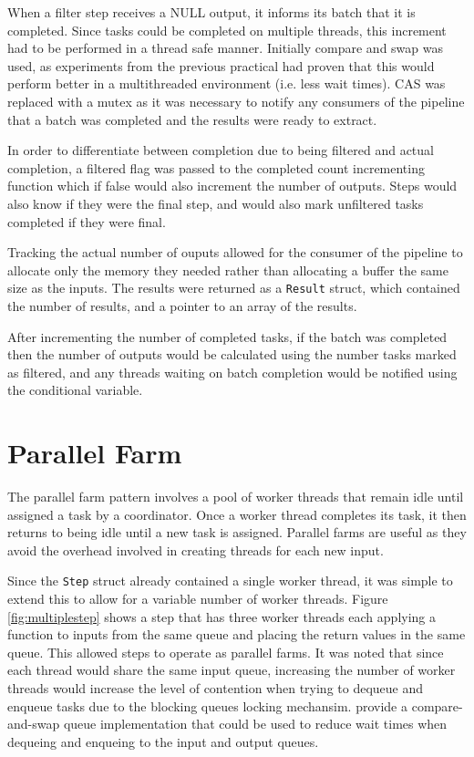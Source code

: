 \documentclass[12pt]{article}
\def\code#1{\texttt{#1}}
\begin{document}
When a filter step receives a NULL output, it informs its batch that it is completed. Since tasks could be completed on multiple threads, this increment had to be performed in a thread safe manner. Initially compare and swap was used, as experiments from the previous practical had proven that this would perform better in a multithreaded environment (i.e. less wait times). CAS was replaced with a mutex as it was necessary to notify any consumers of the pipeline that a batch was completed and the results were ready to extract. 

In order to differentiate between completion due to being filtered and actual completion, a filtered flag was passed to the completed count incrementing function which if false would also increment the number of outputs. Steps would also know if they were the final step, and would also mark unfiltered tasks completed if they were final. 

Tracking the actual number of ouputs allowed for the consumer of the pipeline to allocate only the memory they needed rather than allocating a buffer the same size as the inputs. The results were returned as a \code{Result} struct, which contained the number of results, and a pointer to an array of the results.

After incrementing the number of completed tasks, if the batch was completed then the number of outputs would be calculated using the number tasks marked as filtered, and any threads waiting on batch completion would be notified using the conditional variable.

\section{Parallel Farm}

The parallel farm pattern involves a pool of worker threads that remain idle until assigned a task by a coordinator. Once a worker thread completes its task, it then returns to being idle until a new task is assigned. Parallel farms are useful as they avoid the overhead involved in creating threads for each new input. 

Since the \code{Step} struct already contained a single worker thread, it was simple to extend this to allow for a variable number of worker threads. Figure \ref{fig:multiplestep} shows a step that has three worker threads each applying a function to inputs from the same queue and placing the return values in the same queue. This allowed steps to operate as parallel farms. It was noted that since each thread would share the same input queue, increasing the number of worker threads would increase the level of contention when trying to dequeue and enqueue tasks due to the blocking queues locking mechansim. \cite{casqueue} provide a compare-and-swap queue implementation that could be used to reduce wait times when dequeing and enqueing to the input and output queues.
\end{document}
